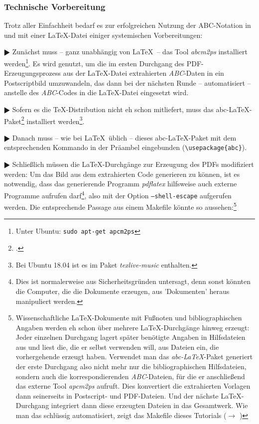 \subsubsection{Technische Vorbereitung}

Trotz aller Einfachheit bedarf es zur erfolgreichen Nutzung der ABC-Notation
in und mit einer \LaTeX-Datei einiger systemischen Vorbereitungen:

$\RHD$ Zunächst muss -- ganz unabhängig von \LaTeX\ -- das Tool \emph{abcm2ps}
installiert werden\footnote{Unter Ubuntu: \texttt{sudo apt-get apcm2ps}}. Es
wird genutzt, um die im  ersten Durchgang des PDF-Erzeugungsprozess aus der
\LaTeX-Datei extrahierten \emph{ABC}-Daten in ein Postscriptbild
umzuwandeln, das dann bei der nächsten Runde -- automatisiert -- anstelle des
\emph{ABC}-Codes in die \LaTeX-Datei eingesetzt wird.
  
$\RHD$ Sofern es die \TeX-Distribution nicht eh schon mitliefert, muss das
abc-\LaTeX-Paket\footcite[vgl.][\nopage wp]{CtanAbc2018a} installiert
werden\footnote{Bei Ubuntu 18.04 ist es im Paket \emph{texlive-music} enthalten.}.
  
$\RHD$ Danach muss -- wie bei \LaTeX\ üblich -- dieses
abc-\LaTeX-Paket  mit dem entsprechenden Kommando in der Präambel
eingebunden (\texttt{\textbackslash{usepackage}\{abc\}}).
  
$\RHD$ Schließlich müssen die \LaTeX-Durchgänge zur Erzeugung des PDFs
modifiziert werden: Um das Bild aus dem extrahierten Code generieren zu können,
ist es notwendig, dass das generierende Programm \emph{pdflatex} hilfsweise auch
externe Programme aufrufen darf\footnote{Dies ist normalerweise aus
Sicherheitsgründen untersagt, denn sonst könnten die Computer, die die Dokumente
erzeugen, aus 'Dokumenten' heraus manipuliert werden.}, also mit der Option
\texttt{--shell-escape} aufgerufen werden. Die entsprechende Passage aus einem
Makefile könnte so aussehen:\footnote{Wissenschaftliche \LaTeX-Dokumente
mit Fußnoten und bibliographischen Angaben werden eh schon über mehrere
\LaTeX-Durchgänge hinweg erzeugt: Jeder einzelnen Durchgang lagert später
benötigte Angaben in Hilfsdateien aus und liest die, die er selbst verwenden
will, aus Dateien ein, die vorhergehende erzeugt haben.
Verwendet man das \emph{abc-LaTeX}-Paket generiert der erste Durchgang also
nicht mehr nur die bibliographischen Hilfsdateien, sondern auch die
korrespondierenden \emph{ABC}-Dateien, für die er anschließend das externe Tool
\emph{apcm2ps} aufruft. Dies konvertiert die extrahierten Vorlagen dann
seinerseits in Postscript- und PDF-Dateien. Und der nächste
\LaTeX-Durchgang integriert dann diese erzeugten Dateien in das
Gesamtwerk. Wie man das schlüssig automatisiert, zeigt das Makefile dieses
Tutorials ($\rightarrow$
) } 

